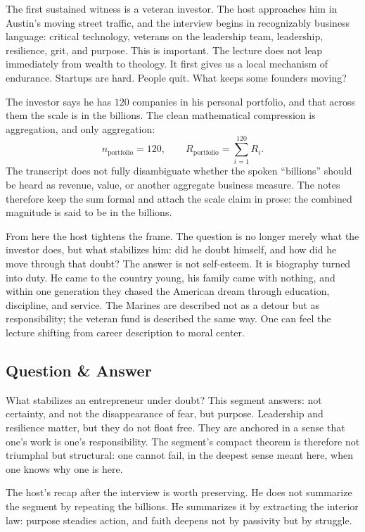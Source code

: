 The first sustained witness is a veteran investor. The host approaches him in Austin's moving street traffic, and the interview begins in recognizably business language: critical technology, veterans on the leadership team, leadership, resilience, grit, and purpose. This is important. The lecture does not leap immediately from wealth to theology. It first gives us a local mechanism of endurance. Startups are hard. People quit. What keeps some founders moving?

The investor says he has \(120\) companies in his personal portfolio, and that across them the scale is in the billions. The clean mathematical compression is aggregation, and only aggregation:
\begin{equation}
n_{\text{portfolio}} = 120, \qquad
R_{\text{portfolio}} = \sum_{i=1}^{120} R_i.
\end{equation}
The transcript does not fully disambiguate whether the spoken ``billions'' should be heard as revenue, value, or another aggregate business measure. The notes therefore keep the sum formal and attach the scale claim in prose: the combined magnitude is said to be in the billions.

From here the host tightens the frame. The question is no longer merely what the investor does, but what stabilizes him: did he doubt himself, and how did he move through that doubt? The answer is not self-esteem. It is biography turned into duty. He came to the country young, his family came with nothing, and within one generation they chased the American dream through education, discipline, and service. The Marines are described not as a detour but as responsibility; the veteran fund is described the same way. One can feel the lecture shifting from career description to moral center.

\subsection{Question \& Answer}

What stabilizes an entrepreneur under doubt? This segment answers: not certainty, and not the disappearance of fear, but purpose. Leadership and resilience matter, but they do not float free. They are anchored in a sense that one's work is one's responsibility. The segment's compact theorem is therefore not triumphal but structural: one cannot fail, in the deepest sense meant here, when one knows why one is here.

The host's recap after the interview is worth preserving. He does not summarize the segment by repeating the billions. He summarizes it by extracting the interior law: purpose steadies action, and faith deepens not by passivity but by struggle.

